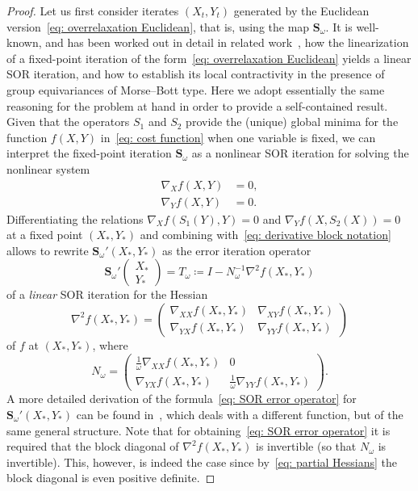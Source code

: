 \documentclass[a4paper]{article}
\newcommand{\bS}{\mathbf{S}}
\theoremstyle{definition}
\numberwithin{equation}{section}
\begin{document}
\begin{proof}
Let us first consider iterates $(X_t,Y_t)$ generated by the Euclidean version~\eqref{eq: overrelaxation Euclidean}, that is, using the map $\bS_\omega$. It is well-known, and has been worked out in detail in related work~\cite{Lehmann2022,Oseledets2023}, how the linearization of a fixed-point iteration of the form~\eqref{eq: overrelaxation Euclidean} yields a linear SOR iteration, and how to establish its local contractivity in the presence of group equivariances of Morse--Bott type. Here we adopt essentially the same reasoning for the problem at hand in order to provide a self-contained result. Given that the operators $S_1$ and $S_2$ provide the (unique) global minima for the function $f(X,Y)$ in~\eqref{eq: cost function} when one variable is fixed, we can interpret the fixed-point iteration $\bS_\omega$ as a nonlinear SOR iteration for solving the nonlinear system
\begin{align*}
 \nabla_X f(X,Y) &= 0, \\ \nabla_Y f(X,Y) &=0.
\end{align*}
Differentiating the relations $\nabla_X f(S_1(Y),Y) = 0$ and $\nabla_Y f(X,S_2(X)) = 0$ at a fixed point $(X_*,Y_*)$ and combining with~\eqref{eq: derivative block notation} allows to rewrite $\bS_\omega'(X_*,Y_*)$ as the error iteration operator
\begin{equation}\label{eq: SOR error operator}
 \bS_\omega'\!\begin{pmatrix} X_* \\ Y_* \end{pmatrix} = T_\omega \coloneqq I - N_\omega^{-1} \nabla^2 f(X_*,Y_*)
\end{equation}
of a \emph{linear} SOR iteration for the Hessian
\[
 \nabla^2 f(X_*,Y_*) = \begin{pmatrix} \nabla_{XX} f(X_*,Y_*) & \nabla_{XY} f(X_*,Y_*) \\ \nabla_{YX} f(X_*,Y_*) & \nabla_{YY} f(X_*,Y_*)   \end{pmatrix}
\]
of $f$ at $(X_*,Y_*)$, where
\[
 N_\omega = \begin{pmatrix} \frac{1}{\omega} \nabla_{XX} f(X_*,Y_*) & 0 \\ \nabla_{YX} f(X_*,Y_*) & \frac{1}{\omega} \nabla_{YY} f(X_*,Y_*) \end{pmatrix}.
\]
A more detailed derivation of the formula~\eqref{eq: SOR error operator} for $\bS_\omega'(X_*,Y_*)$ can be found in~\cite[Eqs.~(18)--(20)]{Oseledets2023}, which deals with a different function, but of the same general structure. Note that for obtaining~\eqref{eq: SOR error operator} it is required that the block diagonal of $\nabla^2 f(X_*,Y_*)$ is invertible (so that $N_\omega$ is invertible). This, however, is indeed the case since by~\eqref{eq: partial Hessians} the block diagonal is even positive definite.


\end{proof}
\end{document}
